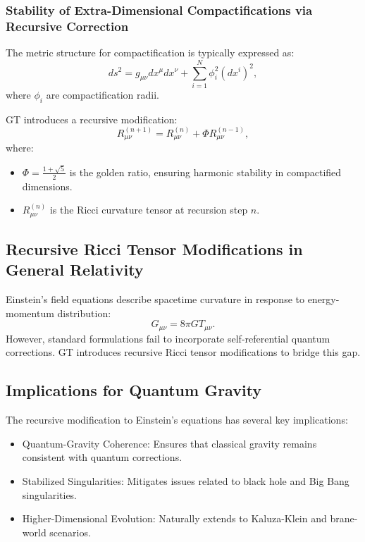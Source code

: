 \documentclass{article}
\theoremstyle{plain}
\begin{document}
\subsubsection{Stability of Extra-Dimensional Compactifications via Recursive Correction}
The metric structure for compactification is typically expressed as:
\begin{equation}
ds^2 = g_{\mu\nu} dx^{\mu} dx^{\nu} + \sum_{i=1}^{N} \phi^2_i (dx^i)^2,
\end{equation}
where $\phi_i$ are compactification radii.

GT introduces a recursive modification:
\begin{equation}
R_{\mu\nu}^{(n+1)} = R_{\mu\nu}^{(n)} + \Phi R_{\mu\nu}^{(n-1)},
\end{equation}
where:
\begin{itemize}
\item $\Phi = \frac{1+\sqrt{5}}{2}$ is the golden ratio, ensuring harmonic stability in compactified dimensions.
\item $R_{\mu\nu}^{(n)}$ is the Ricci curvature tensor at recursion step $n$.
\end{itemize}

\subsection{Recursive Ricci Tensor Modifications in General Relativity}
Einstein’s field equations describe spacetime curvature in response to energy-momentum distribution:
\begin{equation}
G_{\mu\nu} = 8\pi G T_{\mu\nu}.
\end{equation}
However, standard formulations fail to incorporate self-referential quantum corrections. GT introduces recursive Ricci tensor modifications to bridge this gap.

\subsection{Implications for Quantum Gravity}
The recursive modification to Einstein’s equations has several key implications:
\begin{itemize}
\item Quantum-Gravity Coherence: Ensures that classical gravity remains consistent with quantum corrections.
\item Stabilized Singularities: Mitigates issues related to black hole and Big Bang singularities.
\item Higher-Dimensional Evolution: Naturally extends to Kaluza-Klein and brane-world scenarios.
\end{itemize}
\end{document}
